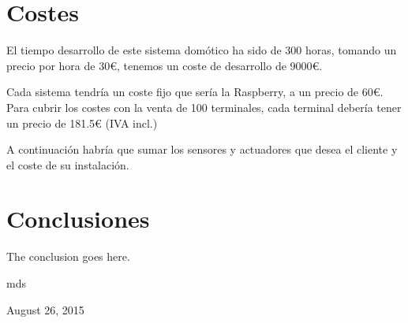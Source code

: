 \documentclass[10pt,journal,compsoc]{IEEEtran}
\begin{document}
\section{Costes}
El tiempo desarrollo de este sistema domótico ha sido de 300 horas, tomando un precio por hora de 30\euro, tenemos un coste de desarrollo de 9000\euro.

Cada sistema tendría un coste fijo que sería la Raspberry, a un precio de 60\euro. Para cubrir los costes con la venta de 100 terminales, cada terminal debería tener un precio de 181.5\euro
(IVA incl.)

A continuación habría que sumar los sensores y actuadores que desea el cliente y el coste de su instalación.

\section{Conclusiones}
The conclusion goes here.

\hfill mds
 
\hfill August 26, 2015

\end{document}
